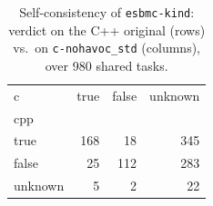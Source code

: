 \begin{table}[t]
  \centering
  \caption{Self-consistency of \texttt{esbmc-kind}: verdict on the C++ original (rows) vs.\ on \texttt{c-nohavoc_std} (columns), over 980 shared tasks.}
  \label{tab:selfpair-esbmc-kind-c-nohavoc_std}
\begin{tabular}{lrrr}
\toprule
c & true & false & unknown \\
cpp &  &  &  \\
\midrule
true & 168 & 18 & 345 \\
false & 25 & 112 & 283 \\
unknown & 5 & 2 & 22 \\
\bottomrule
\end{tabular}
\end{table}
